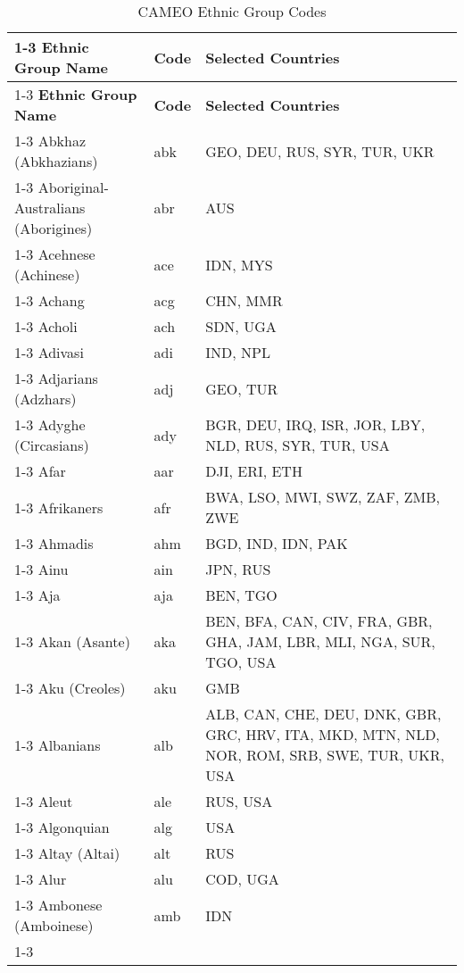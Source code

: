 \documentclass[12pt]{article}
\begin{document}
\begin{center}
\begin{longtable}{|p{7cm}|p{1cm}|p{7cm}|}
\caption{CAMEO Ethnic Group Codes}
\label{tab:ECS1}
\\ \cline{1-3}
\textbf{Ethnic Group Name}  & \textbf{Code} & \textbf{Selected Countries} \\ \cline{1-3}
\hline
\endfirsthead
\hline
\textbf{Ethnic Group Name}  & \textbf{Code} & \textbf{Selected Countries} \\ \cline{1-3}
\hline
\endhead
\hline
\multicolumn{3}{r}{\emph{continued on next page}}
\endfoot
\hline
\endlastfoot
Abkhaz (Abkhazians)	&	abk 	&	GEO, DEU, RUS, SYR, TUR, UKR	\\	\cline{1-3}
Aboriginal-Australians (Aborigines)	&	abr	&	AUS	\\	\cline{1-3}
Acehnese (Achinese)	&	ace 	&	IDN, MYS	\\	\cline{1-3}
Achang	&	acg	&	CHN, MMR	\\	\cline{1-3}
Acholi	&	ach 	&	SDN, UGA	\\	\cline{1-3}
Adivasi	&	adi	&	IND, NPL	\\	\cline{1-3}
Adjarians (Adzhars)	&	adj	&	GEO, TUR	\\	\cline{1-3}
Adyghe (Circasians)	&	ady 	&	BGR, DEU, IRQ, ISR, JOR, LBY, NLD, RUS, SYR, TUR, USA	\\	\cline{1-3}
Afar	&	aar 	&	DJI, ERI, ETH	\\	\cline{1-3}
Afrikaners	&	afr 	&	BWA, LSO, MWI, SWZ, ZAF, ZMB,  ZWE	\\	\cline{1-3}
Ahmadis	&	ahm	&	BGD, IND, IDN, PAK 	\\	\cline{1-3}
Ainu	&	ain 	&	JPN, RUS	\\	\cline{1-3}
Aja	&	aja	&	BEN, TGO	\\	\cline{1-3}
Akan (Asante)	&	aka 	&	BEN, BFA, CAN, CIV, FRA, GBR, GHA, JAM, LBR, MLI, NGA, SUR, TGO, USA	\\	\cline{1-3}
Aku (Creoles)	&	aku	&	GMB	\\	\cline{1-3}
Albanians	&	alb	&	ALB, CAN, CHE, DEU, DNK, GBR, GRC, HRV, ITA, MKD, MTN, NLD, NOR, ROM, SRB, SWE, TUR, UKR, USA	 \\	\cline{1-3}
Aleut	&	ale 	&	RUS, USA	\\	\cline{1-3}
Algonquian	&	alg 	&	USA	\\	\cline{1-3}
Altay (Altai)	&	alt 	&	RUS	\\	\cline{1-3}
Alur	&	alu	&	COD, UGA	\\	\cline{1-3}
Ambonese (Amboinese)	&	amb	&	IDN	\\	\cline{1-3}

\end{longtable}
\end{center}
\end{document}
